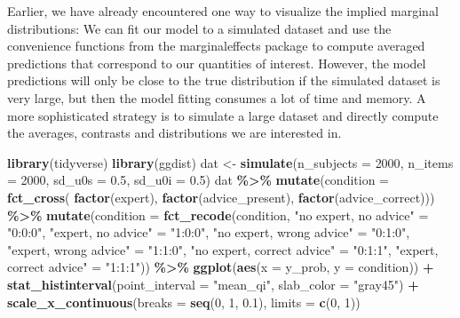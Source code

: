 \documentclass[
  man,floatsintext]{apa6}
\newenvironment{Shaded}{\begin{snugshade}}{\end{snugshade}}
\newcommand{\AttributeTok}[1]{\textcolor[rgb]{0.13,0.29,0.53}{#1}}
\newcommand{\DecValTok}[1]{\textcolor[rgb]{0.00,0.00,0.81}{#1}}
\newcommand{\FloatTok}[1]{\textcolor[rgb]{0.00,0.00,0.81}{#1}}
\newcommand{\FunctionTok}[1]{\textcolor[rgb]{0.13,0.29,0.53}{\textbf{#1}}}
\newcommand{\NormalTok}[1]{#1}
\newcommand{\OtherTok}[1]{\textcolor[rgb]{0.56,0.35,0.01}{#1}}
\newcommand{\SpecialCharTok}[1]{\textcolor[rgb]{0.81,0.36,0.00}{\textbf{#1}}}
\newcommand{\StringTok}[1]{\textcolor[rgb]{0.31,0.60,0.02}{#1}}
\begin{document}
Earlier, we have already encountered one way to visualize the implied marginal distributions: We can fit our model to a simulated dataset and use the convenience functions from the marginaleffects package to compute averaged predictions that correspond to our quantities of interest. However, the model predictions will only be close to the true distribution if the simulated dataset is very large, but then the model fitting consumes a lot of time and memory. A more sophisticated strategy is to simulate a large dataset and directly compute the averages, contrasts and distributions we are interested in.

\begin{Shaded}
\begin{Highlighting}[]
\FunctionTok{library}\NormalTok{(tidyverse)}
\FunctionTok{library}\NormalTok{(ggdist)}
\NormalTok{dat }\OtherTok{\textless{}{-}} \FunctionTok{simulate}\NormalTok{(}\AttributeTok{n\_subjects =} \DecValTok{2000}\NormalTok{, }\AttributeTok{n\_items =} \DecValTok{2000}\NormalTok{, }\AttributeTok{sd\_u0s =} \FloatTok{0.5}\NormalTok{, }\AttributeTok{sd\_u0i =} \FloatTok{0.5}\NormalTok{)}
\NormalTok{dat }\SpecialCharTok{\%\textgreater{}\%} 
  \FunctionTok{mutate}\NormalTok{(}\AttributeTok{condition =} \FunctionTok{fct\_cross}\NormalTok{(}
    \FunctionTok{factor}\NormalTok{(expert), }\FunctionTok{factor}\NormalTok{(advice\_present), }\FunctionTok{factor}\NormalTok{(advice\_correct))) }\SpecialCharTok{\%\textgreater{}\%}
  \FunctionTok{mutate}\NormalTok{(}\AttributeTok{condition =} \FunctionTok{fct\_recode}\NormalTok{(condition,}
    \StringTok{"no expert, no advice"} \OtherTok{=} \StringTok{"0:0:0"}\NormalTok{, }\StringTok{"expert, no advice"} \OtherTok{=} \StringTok{"1:0:0"}\NormalTok{, }
    \StringTok{"no expert, wrong advice"} \OtherTok{=} \StringTok{"0:1:0"}\NormalTok{, }\StringTok{"expert, wrong advice"} \OtherTok{=} \StringTok{"1:1:0"}\NormalTok{,}
    \StringTok{"no expert, correct advice"} \OtherTok{=} \StringTok{"0:1:1"}\NormalTok{, }\StringTok{"expert, correct advice"} \OtherTok{=} \StringTok{"1:1:1"}\NormalTok{)) }\SpecialCharTok{\%\textgreater{}\%} 
  \FunctionTok{ggplot}\NormalTok{(}\FunctionTok{aes}\NormalTok{(}\AttributeTok{x =}\NormalTok{ y\_prob, }\AttributeTok{y =}\NormalTok{ condition)) }\SpecialCharTok{+}
  \FunctionTok{stat\_histinterval}\NormalTok{(}\AttributeTok{point\_interval =} \StringTok{"mean\_qi"}\NormalTok{, }\AttributeTok{slab\_color =} \StringTok{"gray45"}\NormalTok{) }\SpecialCharTok{+}
  \FunctionTok{scale\_x\_continuous}\NormalTok{(}\AttributeTok{breaks =} \FunctionTok{seq}\NormalTok{(}\DecValTok{0}\NormalTok{, }\DecValTok{1}\NormalTok{, }\FloatTok{0.1}\NormalTok{), }\AttributeTok{limits =} \FunctionTok{c}\NormalTok{(}\DecValTok{0}\NormalTok{, }\DecValTok{1}\NormalTok{))}
\end{Highlighting}
\end{Shaded}
\end{document}
